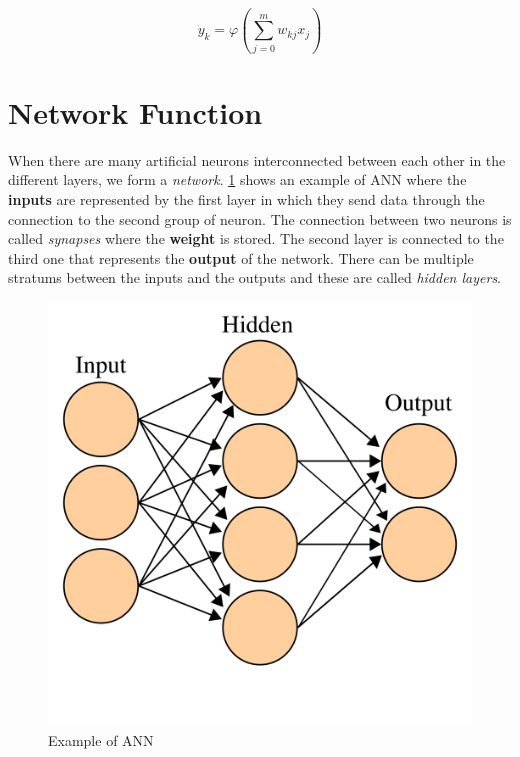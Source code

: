 \begin{equation*}
    y_k = \varphi \left ( \sum_{j=0}^{m} w_{kj} x_j \right )
\end{equation*}

\section{Network Function}
When there are many artificial neurons interconnected between each other in the different layers, we form a \textit{network}. \ref{fig:ann} shows an example of ANN where the \textbf{inputs} are represented by the first layer in which they send data through the connection to the second group of neuron. The connection between two neurons is called \textit{synapses} where the \textbf{weight} is stored. The second layer is connected to the third one that represents the \textbf{output} of the network. There can be multiple stratums between the inputs and the outputs and these are called \textit{hidden layers}. \\

\begin{figure}[!ht]
    \centering
    \includegraphics[scale=0.15]{Figures/ann.png}
    \caption{Example of ANN \cite{ann_wiki}}
    \label{fig:ann}
\end{figure}

